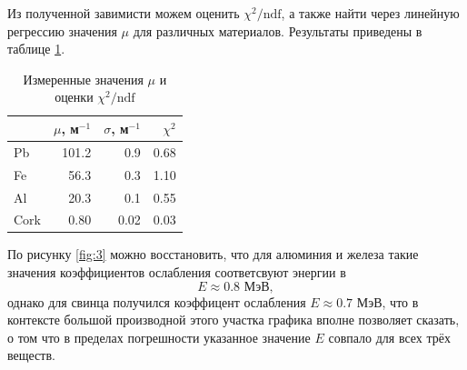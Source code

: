 Из полученной завимисти можем оценить $\chi^2/\text{ndf}$, а также найти через линейную регрессию значения $\mu$ для различных материалов. Результаты приведены в таблице \ref{tab:2}.





\begin{table}[h!]
    \centering
    \caption{Измеренные значения $\mu$ и оценки $\chi^2/\text{ndf}$}
\begin{tabular}{lrrr}
\toprule
    &  $\mu$, м$^{-1}$ &  $\sigma$, м$^{-1}$ &  $\chi^2$ \\
\midrule
  Pb &  101.2 &       0.9 &      0.68 \\
  Fe &   56.3 &       0.3 &      1.10 \\
  Al &   20.3 &       0.1 &      0.55 \\
Cork &    0.80 &       0.02 &      0.03 \\
\bottomrule
\end{tabular}
\label{tab:2}
\end{table}


По рисунку \ref{fig:3} можно восстановить, что для алюминия и железа такие значения коэффициентов ослабления соответсвуют энергии в 
\begin{equation*}
    E \approx 0.8 \text{ МэВ},
\end{equation*}
однако для свинца получился коэффицент ослабления $E \approx 0.7$ МэВ, что в контексте большой производной этого участка графика вполне позволяет сказать,  о том что в пределах погрешности указанное значение $E$ совпало для всех трёх веществ.


